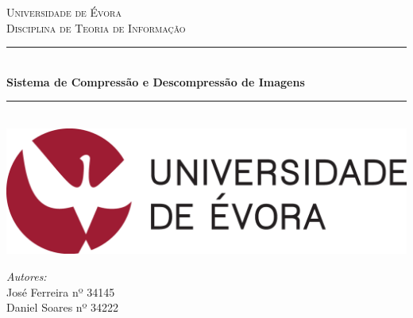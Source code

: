 \documentclass[12pt]{article}
\begin{document}
\begin{titlepage}

\newcommand{\HRule}{\rule{\linewidth}{0.5mm}} %

\center %
 

\textsc{\LARGE Universidade de Évora}\\[1.5cm] %
\textsc{\Large Disciplina de Teoria de Informação}\\[0.5cm] %


\HRule \\[0.4cm]
{ \huge \bfseries Sistema de Compressão e Descompressão de Imagens}\\[0.4cm]
\HRule \\[1.5cm]
 

\includegraphics[scale=1.1]{logo.png}\\[2cm]

\begin{minipage}{0.4\textwidth}
\begin{flushleft} \large
\emph{Autores:}\\
José Ferreira nº 34145\\
Daniel Soares nº 34222
\end{flushleft}
\end{minipage}\\[0.5cm]


\end{titlepage}
\end{document}
